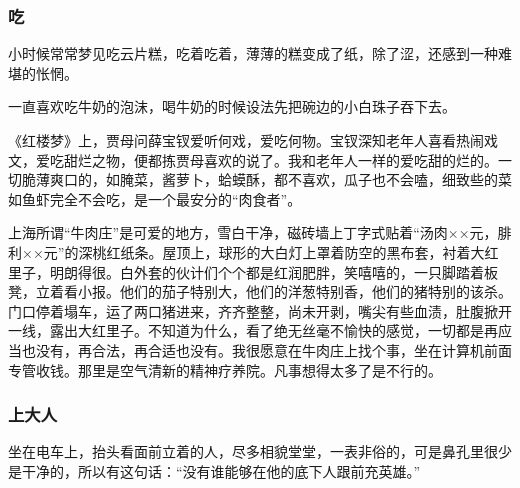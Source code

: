 \subsubsection*{吃}
\par 小时候常常梦见吃云片糕，吃着吃着，薄薄的糕变成了纸，除了涩，还感到一种难堪的怅惘。
\par 一直喜欢吃牛奶的泡沫，喝牛奶的时候设法先把碗边的小白珠子吞下去。
\par 《红楼梦》上，贾母问薛宝钗爱听何戏，爱吃何物。宝钗深知老年人喜看热闹戏文，爱吃甜烂之物，便都拣贾母喜欢的说了。我和老年人一样的爱吃甜的烂的。一切脆薄爽口的，如腌菜，酱萝卜，蛤蟆酥，都不喜欢，瓜子也不会嗑，细致些的菜如鱼虾完全不会吃，是一个最安分的“肉食者”。
\par 上海所谓“牛肉庄”是可爱的地方，雪白干净，磁砖墙上丁字式贴着“汤肉××元，腓利××元”的深桃红纸条。屋顶上，球形的大白灯上罩着防空的黑布套，衬着大红里子，明朗得很。白外套的伙计们个个都是红润肥胖，笑嘻嘻的，一只脚踏着板凳，立着看小报。他们的茄子特别大，他们的洋葱特别香，他们的猪特别的该杀。门口停着塌车，运了两口猪进来，齐齐整整，尚未开剥，嘴尖有些血渍，肚腹掀开一线，露出大红里子。不知道为什么，看了绝无丝毫不愉快的感觉，一切都是再应当也没有，再合法，再合适也没有。我很愿意在牛肉庄上找个事，坐在计算机前面专管收钱。那里是空气清新的精神疗养院。凡事想得太多了是不行的。
\subsubsection*{上大人}
\par 坐在电车上，抬头看面前立着的人，尽多相貌堂堂，一表非俗的，可是鼻孔里很少是干净的，所以有这句话：“没有谁能够在他的底下人跟前充英雄。”
